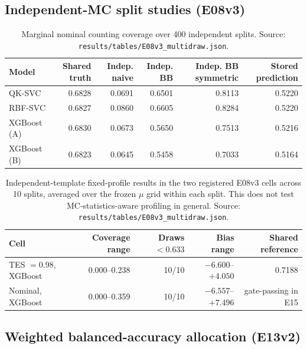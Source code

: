\documentclass[11pt,a4paper]{article}
\begin{document}
\subsection{Independent-MC split studies (E08v3)}

\begin{table}[H]
\centering
\small
\caption{Marginal nominal counting coverage over 400 independent splits. Source: \texttt{results/tables/E08v3\_multidraw.json}.}
\label{tab:e08count}
\begin{tabular}{lrrrrr}
\toprule
Model & Shared truth & Indep. naive & Indep. BB & Indep. BB symmetric & Stored prediction \\
\midrule
QK-SVC & 0.6828 & 0.0691 & 0.6501 & 0.8113 & 0.5220 \\
RBF-SVC & 0.6827 & 0.0860 & 0.6605 & 0.8284 & 0.5220 \\
XGBoost (A) & 0.6830 & 0.0673 & 0.5650 & 0.7513 & 0.5216 \\
XGBoost (B) & 0.6823 & 0.0645 & 0.5458 & 0.7033 & 0.5164 \\
\bottomrule
\end{tabular}
\end{table}

\begin{table}[H]
\centering
\small
\caption{Independent-template fixed-profile results in the two registered E08v3 cells across 10 splits, averaged over the frozen $\mu$ grid within each split. This does not test MC-statistics-aware profiling in general. Source: \texttt{results/tables/E08v3\_multidraw.json}.}
\label{tab:e08profile}
\begin{tabular}{lrrrr}
\toprule
Cell & Coverage range & Draws $<0.633$ & Bias range & Shared reference \\
\midrule
TES $=0.98$, XGBoost & 0.000--0.238 & 10/10 & $-6.600$--$+4.050$ & 0.7188 \\
Nominal, XGBoost & 0.000--0.359 & 10/10 & $-6.557$--$+7.496$ & gate-passing in E15 \\
\bottomrule
\end{tabular}
\end{table}

\subsection{Weighted balanced-accuracy allocation (E13v2)}
\end{document}
